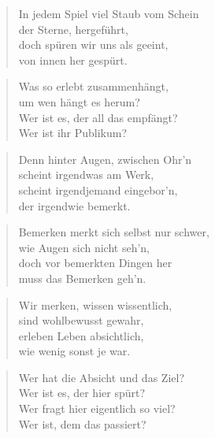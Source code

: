 \documentclass[10pt,a4paper]{article}
\begin{document}
\begin{multicols}{2}
\begin{verse}
In jedem Spiel viel Staub vom Schein \\
der Sterne, hergeführt, \\
doch spüren wir uns als geeint, \\
von innen her gespürt. \\
\end{verse}

\begin{verse}
Was so erlebt zusammenhängt, \\
um wen hängt es herum? \\
Wer ist es, der all das empfängt? \\
Wer ist ihr Publikum? \\
\end{verse}

\begin{verse}
Denn hinter Augen, zwischen Ohr’n \\
scheint irgendwas am Werk, \\
scheint irgendjemand eingebor’n, \\
der irgendwie bemerkt. \\
\end{verse}

\begin{verse}
Bemerken merkt sich selbst nur schwer, \\
wie Augen sich nicht seh’n, \\
doch vor bemerkten Dingen her \\
muss das Bemerken geh’n. \\
\end{verse}

\begin{verse}
Wir merken, wissen wissentlich, \\
sind wohlbewusst gewahr, \\
erleben Leben absichtlich, \\
wie wenig sonst je war. \\
\end{verse}

\begin{verse}
Wer hat die Absicht und das Ziel? \\
Wer ist es, der hier spürt? \\
Wer fragt hier eigentlich so viel? \\
Wer ist, dem das passiert? \\
\end{verse}


\end{multicols}
\end{document}

